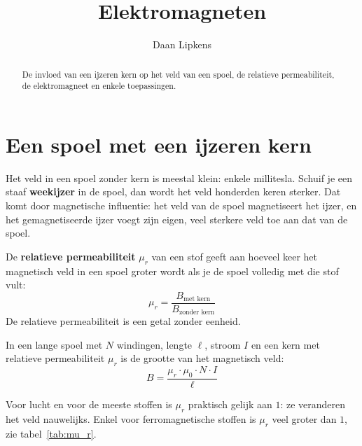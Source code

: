 \documentclass{ximera}
\title{Elektromagneten}
\author{Daan Lipkens}
\begin{document}
\begin{abstract}
    De invloed van een ijzeren kern op het veld van een spoel, de relatieve permeabiliteit, de elektromagneet en enkele toepassingen.
\end{abstract}
\maketitle
\label{ond:magnetisme_elektromagneet}

\section{Een spoel met een ijzeren kern}\label{sec:elektromagneet}
Het veld in een spoel zonder kern is meestal klein: enkele millitesla. Schuif je een staaf \textbf{weekijzer} in de spoel, dan wordt het veld honderden keren sterker. Dat komt door magnetische influentie: het veld van de spoel magnetiseert het ijzer, en het gemagnetiseerde ijzer voegt zijn eigen, veel sterkere veld toe aan dat van de spoel.

\begin{definition}[foldable=true,title={Relatieve permeabiliteit}]\nl
    De \textbf{relatieve permeabiliteit} $\mu_r$ van een stof geeft aan hoeveel keer het magnetisch veld in een spoel groter wordt als je de spoel volledig met die stof vult:
    \begin{equation*}
        \mu_r = \frac{B_{\text{met kern}}}{B_{\text{zonder kern}}}
    \end{equation*}
    De relatieve permeabiliteit is een getal zonder eenheid.
\end{definition}

\begin{proposition}[foldable=true,title={Magnetisch veld in een spoel met kern}]\nl
    In een lange spoel met $N$ windingen, lengte $\ell$, stroom $I$ en een kern met relatieve permeabiliteit $\mu_r$ is de grootte van het magnetisch veld:
    \begin{equation}\label{eq:B_spoel_kern}
        B = \frac{\mu_r \cdot \mu_0 \cdot N \cdot I}{\ell}
    \end{equation}
\end{proposition}

Voor lucht en voor de meeste stoffen is $\mu_r$ praktisch gelijk aan $1$: ze veranderen het veld nauwelijks. Enkel voor ferromagnetische stoffen is $\mu_r$ veel groter dan $1$, zie tabel~\ref{tab:mu_r}.
\end{document}
